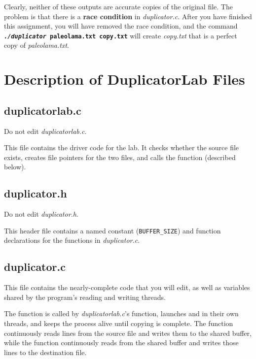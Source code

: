     Clearly, neither of these outputs are accurate copies of the original file.
    The problem is that there is a \textbf{race condition} in \textit{duplicator.c}.
    After you have finished this assignment, you will have removed the race condition, and the command \texttt{\textbf{\textit{./duplicator}~paleolama.txt~copy.txt}} will create \textit{copy.txt} that is a perfect copy of \textit{paleolama.txt}.

    \section{Description of DuplicatorLab Files}

    \subsection{duplicatorlab.c}

    Do not edit \textit{duplicatorlab.c}.

    This file contains the driver code for the lab.
    It checks whether the source file exists, creates file pointers for the two files, and calls the  function (described below).


    \subsection{duplicator.h}\label{subsec:duplicator.h}

    Do not edit \textit{duplicator.h}.

    This header file contains a named constant (\lstinline{BUFFER_SIZE}) and function declarations for the functions in \textit{duplicator.c}.


    \subsection{duplicator.c}\label{subsec:duplicator.c}

    This file contains the nearly-complete code that you will edit, as well as variables shared by the program's reading and writing threads.

    The  function is called by \textit{duplicatorlab.c}'s  function, launches  and  in their own threads, and keeps the process alive until copying is complete.
    The  function continuously reads lines from the source file and writes them to the shared buffer, while the  function continuously reads from the shared buffer and writes those lines to the destination file.

